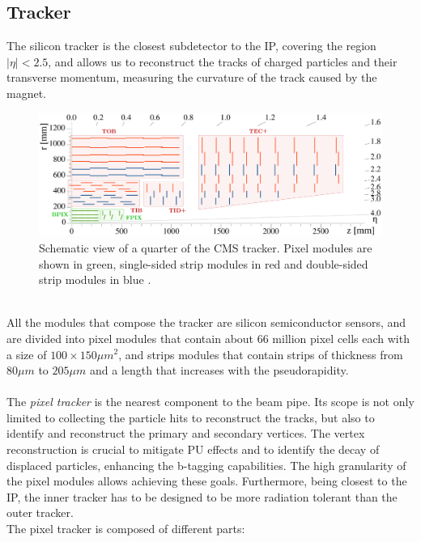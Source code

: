 \subsection{Tracker}
The silicon tracker \cite{CastaldiPatriceSiegristJean-EudesAugustin1997TheReport,CMS_pixel_Phase1_2012} is the closest subdetector to the IP, covering the region $|\eta|<2.5$, and allows us to reconstruct the tracks of charged particles and their transverse momentum, measuring the curvature of the track caused by the magnet.
\begin{figure}[h!]
    \centering
    \includegraphics[width=0.73\linewidth]{fig//chap03-cms/CMS_tracker_Phase1_edit.pdf}
    \caption{Schematic view of a quarter of the CMS tracker. Pixel modules are shown in green, single-sided strip modules in red and double-sided strip modules in blue \cite{DPGResultsTRKTWiki}.}
    \label{fig:cms_tracker}
\end{figure}
\\
All the modules that compose the tracker are silicon semiconductor sensors, and are divided into pixel modules that contain about 66 million pixel cells each with a size of $100 \times 150 \mu m^2$, and strips modules that contain strips of thickness from $80 \mu m$ to $205 \mu m$ and a length that increases with the pseudorapidity.\\
\\
The \emph{pixel tracker} \cite{Adam2021TheUpgrade} is the nearest component to the beam pipe. Its scope is not only limited to collecting the particle hits to reconstruct the tracks, but also to identify and reconstruct the primary and secondary vertices. The vertex reconstruction is crucial to mitigate PU effects and to identify the decay of displaced particles, enhancing the b-tagging capabilities.
The high granularity of the pixel modules allows achieving these goals. Furthermore, being closest to the IP, the inner tracker has to be designed to be more radiation tolerant than the outer tracker.\\
The pixel tracker is composed of different parts:
